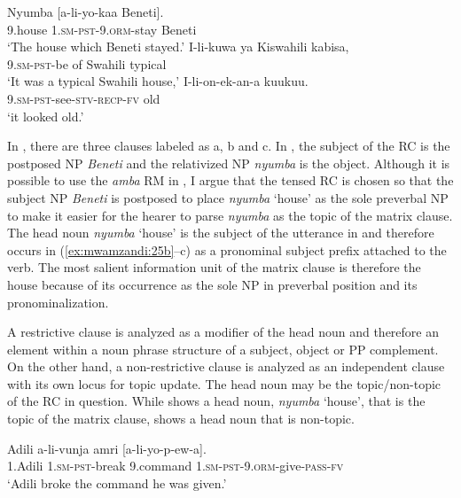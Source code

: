 \documentclass[output=paper,colorlinks,citecolor=brown]{langscibook}
\begin{document}
\ea%
    \label{ex:mwamzandi:25}
    \ea%
    \label{ex:mwamzandi:25a}
    \gll    Nyumba [a-li-yo-kaa Beneti].\\
            9.house \textsc{1.sm-pst-9.orm-}stay Beneti\\
    \glt    ‘The house which Beneti stayed.’
    \ex%
    \label{ex:mwamzandi:25b}
    \gll    I-li-kuwa ya Kiswahili kabisa,\\
            \textsc{9.sm-pst-}be of Swahili typical\\
    \glt    ‘It was a typical Swahili house,’
    \ex%
    \label{ex:mwamzandi:25c}
    \gll    I-li-on-ek-an-a kuukuu.\\
            \textsc{9.sm-pst-}see\textsc{-stv-recp-fv} old\\
    \glt    ‘it looked old.’
    \z
\z

In , there are three clauses labeled as a, b and c. In , the subject of the RC is the postposed NP \textit{Beneti} and the relativized NP \textit{nyumba} is the object. Although it is possible to use the \textit{amba} RM in , I argue that the tensed RC is chosen so that the subject NP \textit{Beneti} is postposed to place \textit{nyumba} ‘house’ as the sole preverbal NP to make it easier for the hearer to parse \textit{nyumba} as the topic of the matrix clause. The head noun \textit{nyumba} ‘house’ is the subject of the utterance in  and therefore occurs in (\ref{ex:mwamzandi:25b}--c) as a pronominal subject prefix attached to the verb. The most salient information unit of the matrix clause is therefore the house because of its occurrence as the sole NP in preverbal position and its pronominalization.

A restrictive clause is analyzed as a modifier of the head noun and therefore an element within a noun phrase structure of a subject, object or PP complement. On the other hand, a non-restrictive clause is analyzed as an independent clause with its own locus for topic update. The head noun may be the topic/non-topic of the RC in question. While  shows a head noun, \textit{nyumba} ‘house’, that is the topic of the matrix clause,  shows a head noun that is non-topic.

\ea%
    \label{ex:mwamzandi:26}
    \gll    Adili a-li-vunja amri [a-li-yo-p-ew-a].\\
            1.Adili \textsc{1.sm-pst-}break 9.command \textsc{1.sm-pst-9.orm-}give\textsc{-pass-fv}\\
    \glt    ‘Adili broke the command he was given.’
\z
\end{document}
